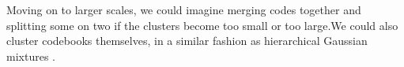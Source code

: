 \documentclass{article}
\begin{document}
Moving on to larger scales, we could imagine merging codes together and
splitting some on two if the clusters become too small or too large.We could
also cluster codebooks themselves, in a similar fashion as hierarchical
Gaussian mixtures \cite{Vasconcelos2001}.


\small



\end{document}
